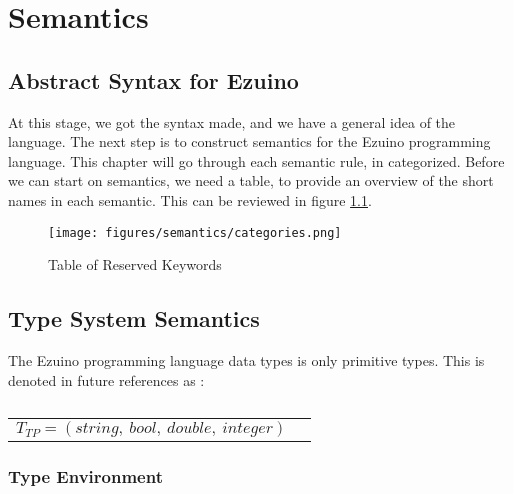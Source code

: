 \chapter{Semantics}
\label{semantics}
\section{Abstract Syntax for Ezuino}
At this stage, we got the syntax made, and we have a general idea of the language. The next step is to construct semantics for the Ezuino programming language. This chapter will go through each semantic rule, in categorized. 
Before we can start on semantics, we need a table, to provide an overview of the short names in each semantic. This can be  reviewed in figure \ref{semCat}.
\begin{figure}[H]
\centering
\texttt{[image: figures/semantics/categories.png]}
\caption{Table of Reserved Keywords}
\label{semCat}
\end{figure}


\section{Type System Semantics}
The Ezuino programming language data types is only primitive types. This is denoted in future references as :
\begin{table}[H]
    \centering
    \begin{longtable}[c] { r c }
      
        \( { T_{TP} = (string,\ bool,\ double,\ integer)} \) \\
    \end{longtable}
    \caption{}\label{s-empty}
\end{table}





\subsection{Type Environment}
